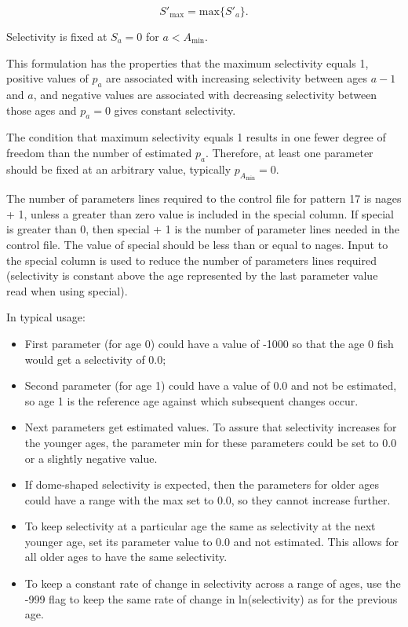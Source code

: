 	\begin{equation}
	S'_{\text{max}} = \mbox{max} \{S'_a\}.
	\end{equation}

Selectivity is fixed at $S_a = 0$ for $a < A_{\text{min}}$. 
	
This formulation has the properties that the maximum selectivity equals 1, positive values of $p_a$ are associated with increasing selectivity between ages $a-1$ and $a$, and negative values are associated with decreasing selectivity between those ages and $p_a = 0$ gives constant selectivity.
	
The condition that maximum selectivity equals 1 results in one fewer degree of freedom than the number of estimated $p_a$. Therefore, at least one parameter should be fixed at an arbitrary value, typically $p_{A_{\text{min}}}=0$.

The number of parameters lines required to the control file for pattern 17 is nages + 1, unless a greater than zero value is included in the special column. If special is greater than 0, then special + 1 is the number of parameter lines needed in the control file. The value of special should be less than or equal to nages. Input to the special column is used to reduce the number of parameters lines required (selectivity is constant above the age represented by the last parameter value read when using special). 
	
In typical usage:
	\begin{itemize}
		\item First parameter (for age 0) could have a value of -1000 so that the age 0 fish would get a selectivity of 0.0;
		\item Second parameter (for age 1) could have a value of 0.0 and not be estimated, so age 1 is the reference age against which subsequent changes occur.
		\item Next parameters get estimated values. To assure that selectivity increases for the younger ages, the parameter min for these parameters could be set to 0.0 or a slightly negative value.
		\item If dome-shaped selectivity is expected, then the parameters for older ages could have a range with the max set to 0.0, so they cannot increase further.
		\item To keep selectivity at a particular age the same as selectivity at the next younger age, set its parameter value to 0.0 and not estimated. This allows for all older ages to have the same selectivity.
		\item To keep a constant rate of change in selectivity across a range of ages, use the -999 flag to keep the same rate of change in ln(selectivity) as for the previous age.
	\end{itemize}

